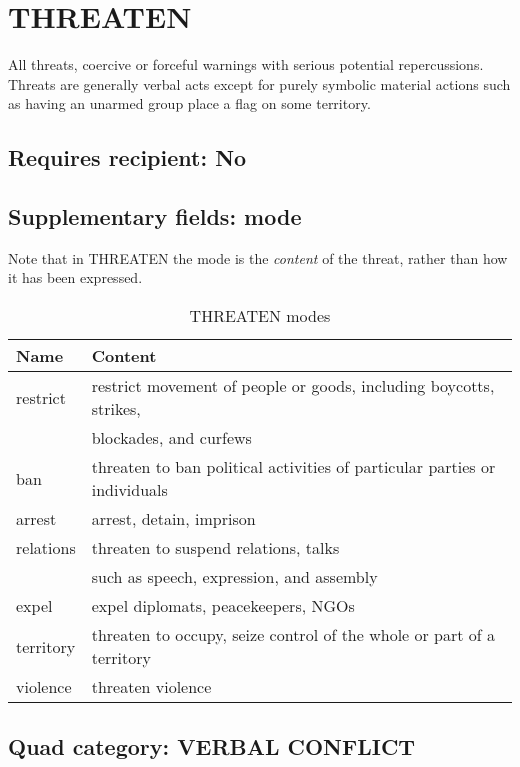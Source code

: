 \documentclass[11pt]{report}
\newcommand{\plcat}[1]{\textsf{#1}}
\newcommand{\ti}[1]{\textit{#1}}
\begin{document}
\newpage


\section{THREATEN}

All threats, coercive or forceful warnings with serious potential repercussions. Threats are generally verbal acts except for purely symbolic material actions such as having an unarmed group place a flag on some territory.
\subsection{Requires recipient: No}

\subsection{Supplementary fields: mode}

Note that in \plcat{THREATEN} the mode is the \ti{content} of the threat, rather than how it has been expressed.

\begin{table}[htp]
\caption{THREATEN modes}
\begin{center}
\begin{tabular}{|l|l|}
\hline
Name & Content \\
\hline
restrict & restrict movement of people or goods, including boycotts, strikes,  \\
& blockades, and curfews \\
ban & threaten to ban political activities of particular parties or individuals \\
arrest & arrest, detain, imprison \\
relations & threaten to suspend relations, talks \\
& such as speech, expression, and assembly\\
expel & expel diplomats, peacekeepers, NGOs \\
territory & threaten to occupy, seize control of the whole or part of a territory \\
violence & threaten violence \\
\hline
\end{tabular}
\end{center}
\label{tab:threatmode}
\end{table}%

\subsection{Quad category: VERBAL CONFLICT}
\end{document}
